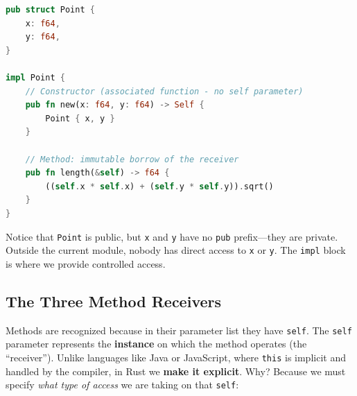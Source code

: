 \begin{lstlisting}[language=Rust]
pub struct Point {
    x: f64,
    y: f64,
}

impl Point {
    // Constructor (associated function - no self parameter)
    pub fn new(x: f64, y: f64) -> Self {
        Point { x, y }
    }

    // Method: immutable borrow of the receiver
    pub fn length(&self) -> f64 {
        ((self.x * self.x) + (self.y * self.y)).sqrt()
    }
}
\end{lstlisting}

Notice that \texttt{Point} is public, but \texttt{x} and \texttt{y} have no \texttt{pub} prefix---they are private. Outside the current module, nobody has direct access to \texttt{x} or \texttt{y}. The \texttt{impl} block is where we provide controlled access.

\subsection{The Three Method Receivers}

Methods are recognized because in their parameter list they have \texttt{self}. The \texttt{self} parameter represents the \textbf{instance} on which the method operates (the ``receiver''). Unlike languages like Java or JavaScript, where \texttt{this} is implicit and handled by the compiler, in Rust we \textbf{make it explicit}. Why? Because we must specify \textit{what type of access} we are taking on that \texttt{self}:

